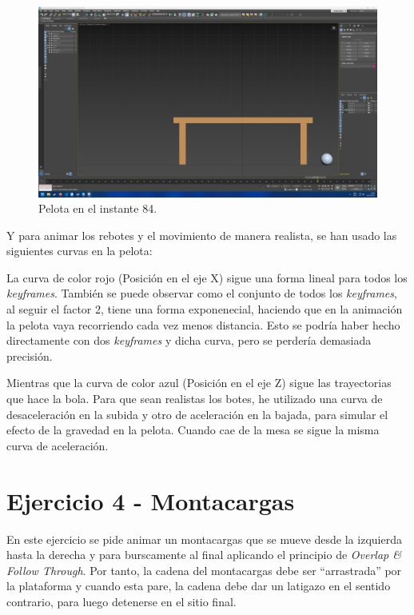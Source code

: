 \documentclass{article}
\begin{document}
\begin{figure}[H]
    \centering
    \includegraphics[width=\textwidth]{imagenes/Ejercicio3/keyframes/84.png}
    \caption{Pelota en el instante 84.}
\end{figure}

Y para animar los rebotes y el movimiento de manera realista, se han usado las siguientes curvas en la pelota:


La curva de color rojo (Posición en el eje X) sigue una forma lineal para todos los \textit{keyframes}. También se puede observar como el conjunto de todos los \textit{keyframes}, al seguir el factor 2, tiene una forma exponenecial, haciendo que en la animación la pelota vaya recorriendo cada vez menos distancia. 
Esto se podría haber hecho directamente con dos \textit{keyframes} y dicha curva, pero se perdería demasiada precisión. %

Mientras que la curva de color azul (Posición en el eje Z) sigue las trayectorias que hace la bola. Para que sean realistas los botes, he utilizado una curva de desaceleración en la subida y otro de aceleración en la bajada, para simular el efecto de la gravedad en la pelota. Cuando cae de la mesa se sigue la misma curva de aceleración.

\section{Ejercicio 4 - Montacargas}

En este ejercicio se pide animar un montacargas que se mueve desde la izquierda hasta la derecha y para burscamente al final aplicando el principio de \textit{Overlap \& Follow Through}. Por tanto, la cadena del montacargas debe ser ``arrastrada'' por la plataforma y cuando esta pare, la cadena debe dar un latigazo en el sentido contrario, para luego detenerse en el sitio final.
\end{document}
